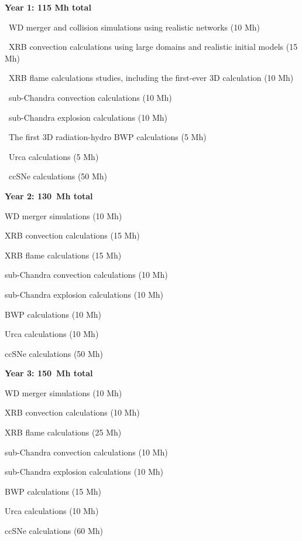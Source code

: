\begin{tightitem}
\item {\bf Year 1: 115 Mh total }
%
\begin{tightitem}
\item \castro\ WD merger and collision simulations using realistic networks (10 Mh)
\item \maestro\ XRB convection calculations using large domains and realistic initial models (15 Mh)
\item \castro\ XRB flame calculations studies, including the first-ever 3D calculation (10 Mh)
\item \maestro\ sub-Chandra convection calculations (10 Mh)
\item \flash\ sub-Chandra explosion calculations (10 Mh)
\item \castro\ The first 3D radiation-hydro BWP calculations (5 Mh)
\item \maestro\ Urca calculations (5 Mh)
\item \chimera\ ccSNe calculations (50 Mh)
\end{tightitem}
%
\item {\bf Year 2: 130~Mh total}
%
\begin{tightitem}
\item WD merger simulations (10 Mh)
\item XRB convection calculations (15 Mh)
\item XRB flame calculations (15 Mh)
\item sub-Chandra convection calculations (10 Mh)
\item sub-Chandra explosion calculations (10 Mh)
\item BWP calculations (10 Mh)
\item Urca calculations (10 Mh)
\item ccSNe calculations (50 Mh)
\end{tightitem}
%
\item {\bf Year 3: 150~Mh total}
%
\begin{tightitem}
\item WD merger simulations (10 Mh)
\item XRB convection calculations (10 Mh)
\item XRB flame calculations (25 Mh)
\item sub-Chandra convection calculations (10 Mh)
\item sub-Chandra explosion calculations (10 Mh)
\item BWP calculations (15 Mh)
\item Urca calculations (10 Mh)
\item ccSNe calculations (60 Mh)
\end{tightitem}
%
\end{tightitem}

